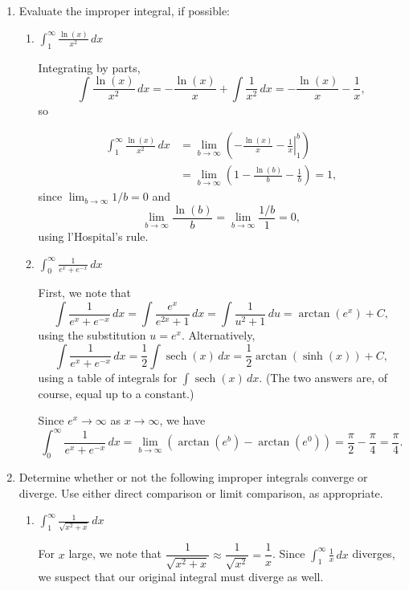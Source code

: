 \documentclass[12pt]{article}
\newcommand{\di}{\displaystyle}
\DeclareMathOperator{\sech}{sech}
\begin{document}
 \begin{enumerate}

\item Evaluate the improper integral, if possible:

\begin{enumerate}
\item $\di \int_1^\infty\frac{\ln(x)}{x^2}\,dx$

Integrating by parts,
\[
\int \frac{\ln(x)}{x^2}\,dx = -\frac{\ln(x)}{x}+\int\frac{1}{x^2}\,dx = -\frac{\ln(x)}{x}-\frac1x,
\]
so 

\begin{align*}
\int_1^\infty\frac{\ln(x)}{x^2}\,dx& = \lim_{b\to \infty}\left(\left.-\frac{\ln(x)}{x}-\frac1x\right|_1^b\right)\\
& = \lim_{b\to \infty}\left(1-\frac{\ln(b)}{b}-\frac{1}{b}\right)=1,
\end{align*}
since $\lim_{b\to\infty}1/b=0$ and
\[
\lim_{b\to\infty}\frac{\ln(b)}{b} = \lim_{b\to\infty}\frac{1/b}{1}=0,
\]
using l'Hospital's rule.

\item $\di \int_0^\infty\frac{1}{e^x+e^{-x}}\,dx$

First, we note that
\[
\int \frac{1}{e^x+e^{-x}}\,dx = \int\frac{e^x}{e^{2x}+1}\,dx = \int\frac{1}{u^2+1}\,du = \arctan(e^x)+C,
\]
using the substitution $u=e^x$. Alternatively,
\[
\int\frac{1}{e^x+e^{-x}}\,dx = \frac12\int\sech(x)\,dx=\frac12\arctan(\sinh(x))+C,
\]
using a table of integrals for $\int\sech(x)\,dx$. (The two answers are, of course, equal up to a constant.) 

Since $e^x\to \infty$ as $x\to \infty$, we have
\[
\int_0^\infty\frac{1}{e^x+e^{-x}}\,dx = \lim_{b\to\infty}(\arctan(e^b)-\arctan(e^0))=\frac{\pi}{2}-\frac{\pi}{4}=\frac{\pi}{4}.
\]
\end{enumerate}
\pagebreak

\item Determine whether or not the following improper integrals converge or diverge. Use either direct comparison or limit comparison, as appropriate.

\begin{enumerate}
\item $\di \int_1^\infty \frac{1}{\sqrt{x^2+x}}\,dx$

For $x$ large, we note that $\dfrac{1}{\sqrt{x^2+x}}\approx \dfrac{1}{\sqrt{x^2}}=\dfrac{1}{x}$. Since $\di\int_1^\infty\frac{1}{x}\,dx$ diverges, we suspect that our original integral must diverge as well.


\end{enumerate}
\end{enumerate}
\end{document}
